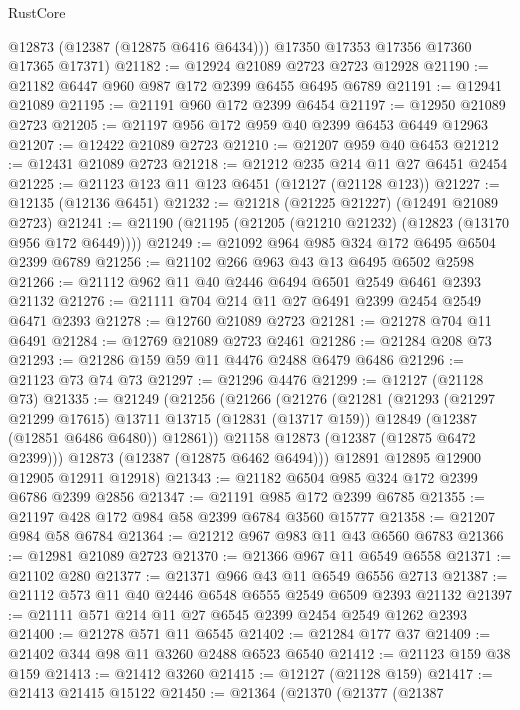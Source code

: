 \begin{lexlean}{RustCore}
\begin{coremodule}
        @12873
        (@12387 (@12875 @6416 @6434)))
      @17350
      @17353
      @17356
      @17360
      @17365
      @17371)
@21182 := @12924 @21089 @2723 @2723 @12928
@21190 := @21182 @6447 @960 @987 @172 @2399 @6455 @6495 @6789
@21191 := @12941 @21089
@21195 := @21191 @960 @172 @2399 @6454
@21197 := @12950 @21089 @2723
@21205 := @21197 @956 @172 @959 @40 @2399 @6453 @6449 @12963
@21207 := @12422 @21089 @2723
@21210 := @21207 @959 @40 @6453
@21212 := @12431 @21089 @2723
@21218 := @21212 @235 @214 @11 @27 @6451 @2454
@21225 := @21123 @123 @11 @123 @6451 (@12127 (@21128 @123))
@21227 := @12135 (@12136 @6451)
@21232 := @21218 (@21225 @21227) (@12491 @21089 @2723)
@21241 := @21190 (@21195 (@21205 (@21210 @21232) (@12823 (@13170 @956 @172 @6449))))
@21249 := @21092 @964 @985 @324 @172 @6495 @6504 @2399 @6789
@21256 := @21102 @266 @963 @43 @13 @6495 @6502 @2598
@21266 := @21112 @962 @11 @40 @2446 @6494 @6501 @2549 @6461 @2393 @21132
@21276 := @21111 @704 @214 @11 @27 @6491 @2399 @2454 @2549 @6471 @2393
@21278 := @12760 @21089 @2723
@21281 := @21278 @704 @11 @6491
@21284 := @12769 @21089 @2723 @2461
@21286 := @21284 @208 @73
@21293 := @21286 @159 @59 @11 @4476 @2488 @6479 @6486
@21296 := @21123 @73 @74 @73
@21297 := @21296 @4476
@21299 := @12127 (@21128 @73)
@21335 := @21249
    (@21256
      (@21266
        (@21276
          (@21281
            (@21293
              (@21297 @21299 @17615)
              @13711
              @13715
              (@12831 (@13717 @159))
              @12849
              (@12387 (@12851 @6486 @6480))
              @12861))
          @21158
          @12873
          (@12387 (@12875 @6472 @2399)))
        @12873
        (@12387 (@12875 @6462 @6494)))
      @12891
      @12895
      @12900
      @12905
      @12911
      @12918)
@21343 := @21182 @6504 @985 @324 @172 @2399 @6786 @2399 @2856
@21347 := @21191 @985 @172 @2399 @6785
@21355 := @21197 @428 @172 @984 @58 @2399 @6784 @3560 @15777
@21358 := @21207 @984 @58 @6784
@21364 := @21212 @967 @983 @11 @43 @6560 @6783
@21366 := @12981 @21089 @2723
@21370 := @21366 @967 @11 @6549 @6558
@21371 := @21102 @280
@21377 := @21371 @966 @43 @11 @6549 @6556 @2713
@21387 := @21112 @573 @11 @40 @2446 @6548 @6555 @2549 @6509 @2393 @21132
@21397 := @21111 @571 @214 @11 @27 @6545 @2399 @2454 @2549 @1262 @2393
@21400 := @21278 @571 @11 @6545
@21402 := @21284 @177 @37
@21409 := @21402 @344 @98 @11 @3260 @2488 @6523 @6540
@21412 := @21123 @159 @38 @159
@21413 := @21412 @3260
@21415 := @12127 (@21128 @159)
@21417 := @21413 @21415 @15122
@21450 := @21364
    (@21370
      (@21377
        (@21387

\end{coremodule}
\end{lexlean}
